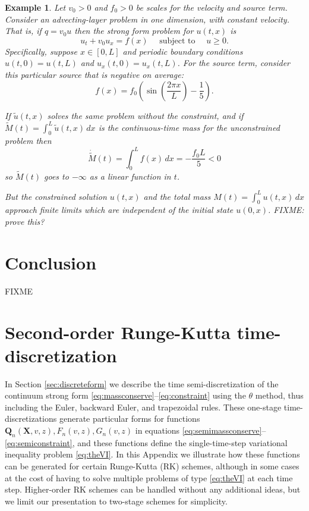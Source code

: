 \documentclass[final,leqno,onefignum,onetabnum]{siamltex1213bueler}
\newtheorem{example}{Example}
\newcommand\bQ{\mathbf{Q}}
\newcommand\bX{\mathbf{X}}
\begin{document}
\begin{example}  Let $v_0>0$ and $f_0>0$ be scales for the velocity and source term.  Consider an advecting-layer problem in one dimension, with constant velocity.  That is, if $q = v_0 u$ then the strong form problem for $u(t,x)$ is
\begin{equation}
u_t + v_0 u_x = f(x) \quad \text{ subject to } \quad u\ge 0.  \label{eq:ex:advectlayer}
\end{equation}
Specifically, suppose $x\in[0,L]$ and periodic boundary conditions $u(t,0)=u(t,L)$ and $u_x(t,0)=u_x(t,L)$.  For the source term, consider this particular source that is negative on average:
    $$f(x) = f_0 \left(\sin\left(\frac{2\pi x}{L}\right) - \frac{1}{5}\right).$$

If $\tilde u(t,x)$ solves the same problem without the constraint, and if $\tilde M(t) = \int_0^L \tilde u(t,x)\,dx$ is the continuous-time mass for the unconstrained problem then
    $$\dot{\tilde M}(t) = \int_0^L f(x)\,dx = -\frac{f_0 L}{5} < 0$$
so $\tilde M(t)$ goes to $-\infty$ as a linear function in $t$.

But the constrained solution $u(t,x)$ and the total mass $M(t) = \int_0^L u(t,x)\,dx$ approach finite limits which are independent of the initial state $u(0,x)$.  FIXME: prove this?
\end{example}

\section{Conclusion} \label{sec:conclusion}  FIXME






\Appendix

\section{Second-order Runge-Kutta time-discretization}   In Section \ref{sec:discreteform} we describe the time semi-discretization of the continuum strong form \eqref{eq:massconserve}--\eqref{eq:constraint} using the $\theta$ method, thus including the Euler, backward Euler, and trapezoidal rules.  These one-stage time-discretizations generate particular forms for functions $\bQ_n(\bX,v,z),F_n(v,z),G_n(v,z)$ in equations \eqref{eq:semimassconserve}--\eqref{eq:semiconstraint}, and these functions define the single-time-step variational inequality problem \eqref{eq:theVI}.  In this Appendix we illustrate how these functions can be generated for certain Runge-Kutta (RK) schemes, although in some cases at the cost of having to solve multiple problems of type \eqref{eq:theVI} at each time step.  Higher-order RK schemes can be handled without any additional ideas, but we limit our presentation to two-stage schemes for simplicity.
\end{document}
